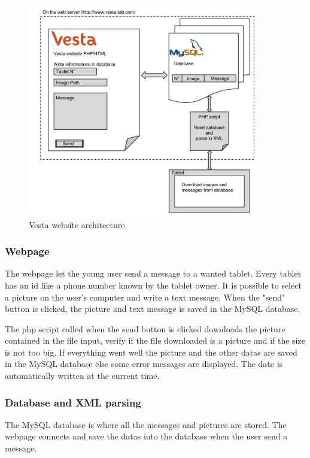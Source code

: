 \begin{figure}[!htb]
    \centering
    \includegraphics[width=0.9\textwidth,keepaspectratio]{chap/softFig/vesta_website2}
    \caption{Vesta website architecture.}
    \label{fig:web archi}
\end{figure}

\clearpage

\subsubsection{Webpage}
The webpage let the young user send a message to a wanted tablet. Every tablet has an id like a phone number known by the tablet owner. It is possible to select a picture on the user's computer and write a text message. When the "send" button is clicked, the picture and text message is saved in the MySQL database.

The php script called when the send button is clicked downloads the picture contained in the file input, verify if the file downloaded is a picture and if the size is not too big. If everything went well the picture and the other datas are saved in the MySQL database else some error messages are displayed. The date is automatically written at the current time.

\clearpage

\subsubsection{Database and XML parsing}
The MySQL database is where all the messages and pictures are stored. The webpage connects and save the datas into the database when the user send a message.

